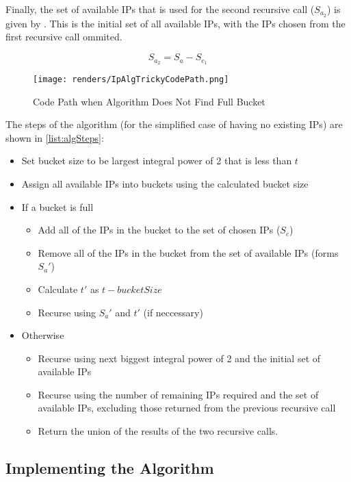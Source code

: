 Finally, the set of available IPs that is used for the second recursive call ($S_{a_2}$) is given by . This is the initial set of all available IPs, with the IPs chosen from the first recursive call ommited.

\begin{equation}\label{eq:availableIpsSecondRecurse}
S_{a_2} = S_a - S_{c_1}
\end{equation}

\begin{figure}[H]
      \centering
      \texttt{[image: renders/IpAlgTrickyCodePath.png]}
      \caption{Code Path when Algorithm Does Not Find Full Bucket}
      \label{fig:ipAlgTrickyCodePath}
\end{figure}

The steps of the algorithm (for the simplified case of having no existing IPs) are shown in \ref{list:algSteps}:
\begin{itemize}\label{list:algSteps}
\item{Set bucket size to be largest integral power of 2 that is less than $t$}
\item{Assign all available IPs into buckets using the calculated bucket size}
\item{If a bucket is full}
  \begin{itemize}
  \item{Add all of the IPs in the bucket to the set of chosen IPs ($S_c$)}
  \item{Remove all of the IPs in the bucket from the set of available IPs (forms $S_a'$)}
  \item{Calculate $t'$ as $t - bucketSize$}
  \item{Recurse using $S_a'$ and $t'$ (if neccessary)}
  \end{itemize}
\item{Otherwise}
  \begin{itemize}
  \item{Recurse using next biggest integral power of 2 and the initial set of available IPs}
  \item{Recurse using the number of remaining IPs required and the set of available IPs, excluding those returned from the previous recursive call}
  \item{Return the union of the results of the two recursive calls.}
  \end{itemize}
\end{itemize}

\subsection{Implementing the Algorithm}
